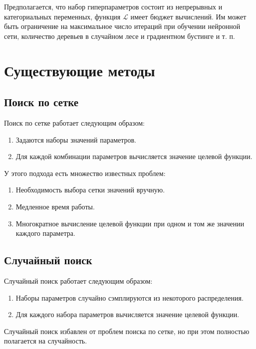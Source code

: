 \documentclass[a4paper,12pt]{article}
\begin{document}
Предполагается, что набор гиперпараметров состоит из непрерывных и категориальных переменных, функция $\mathcal{L}$ имеет бюджет вычислений. Им может быть ограничение на максимальное число итераций при обучении нейронной сети, количество деревьев в случайном лесе и градиентном бустинге и т. п.


\section{Существующие методы}
\subsection{Поиск по сетке}
Поиск по сетке работает следующим образом:
\begin{enumerate}
    \item Задаются наборы значений параметров.
    \item Для каждой комбинации параметров вычисляется значение целевой функции.
\end{enumerate}

У этого подхода есть множество известных проблем:
\begin{enumerate}
    \item Необходимость выбора сетки значений вручную.
    \item Медленное время работы.
    \item Многократное вычисление целевой функции при одном и том же значении каждого параметра.
\end{enumerate}


\subsection{Случайный поиск}
Случайный поиск работает следующим образом:
\begin{enumerate}
    \item Наборы параметров случайно сэмплируются из некоторого распределения.
    \item Для каждого набора параметров вычисляется значение целевой функции.
\end{enumerate}

Случайный поиск избавлен от проблем поиска по сетке, но при этом полностью полагается на случайность.
\end{document}
